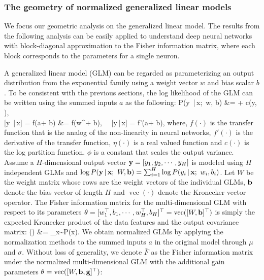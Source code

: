 \documentclass{article}
\newcommand{\T}{\top}
\def\bea#1\eea{\begin{align}#1\end{align}}
\DeclareMathOperator{\vecop}{vec}
\newcommand{\Target}{{\bold y}}
\newcommand{\Gain}{{\bold g}}
\newcommand{\bias}{{b}}
\newcommand{\Bias}{{\bold b}}
\newcommand{\weights}{{w}}
\newcommand{\act}{{a}}
\newcommand{\fisher}{{F}}
\newcommand{\data}{{\bold x}}
\newcommand{\expectation}{\mathop{\mathbb{E}}}
\newcommand{\given}{\,|\,}
\newcommand{\target}{y}
\begin{document}
\subsubsection{The geometry of normalized generalized linear models}
We focus our geometric analysis on the generalized linear model. The results from the following analysis can be easily applied to understand deep neural networks with block-diagonal approximation to the Fisher information matrix, where each block corresponds to the parameters for a single neuron. 

A generalized linear model (GLM) can be regarded as parameterizing an output distribution from the exponential family using a weight vector $w$ and bias scalar $b$. To be consistent with the previous sections, the log likelihood of the GLM can be written using the summed inputs $a$ as the following:
\bea
\log P(y \given \data ;\  w, b) &= \frac{(\act+b) y - \eta(\act+b)}{\phi} + c(y, \phi),\\
\expectation[y \given \data] = f(\act + b) &= f(\weights^\T \data + b), \ \  [\target \given \data] = \phi f'(\act + b),
\eea
where, $f(\cdot)$ is the transfer function that is the analog of the non-linearity in neural networks, $f'(\cdot)$ is the derivative of the transfer function, $\eta(\cdot)$ is a real valued function and $c(\cdot)$ is the log partition function. $\phi$ is a constant that scales the output variance.
Assume a $H$-dimensional output vector $\Target = [y_1, y_2, \cdots, y_H]$ is modeled using $H$ independent GLMs and $\log P(\Target \given \data ;\ W, \Bias) = \sum_{i=1}^H \log P(y_i \given \data ;\ w_i, b_i) $. Let $W$ be the weight matrix whose rows are the weight vectors of the individual GLMs, $\Bias$ denote the bias vector of length $H$ and $\vecop(\cdot)$ denote the Kronecker vector operator.
The Fisher information matrix for the multi-dimensional GLM with respect to its parameters $\theta=[\weights_1^\T, \bias_1,\cdots,\weights_H^\T, \bias_H]^\T = \vecop([W, \Bias]^\T)$ is simply the expected Kronecker product of the data features and the output covariance matrix: 
\bea
\fisher(\theta) &= \expectation_{\data \sim P(\data)}\left[\frac{\text{Cov}[\Target \given \data]}{\phi^2}\otimes\begin{bmatrix}\data\data^\T & \data \\ \data^\T & 1\end{bmatrix}\right].
\eea
We obtain normalized GLMs by applying the normalization methods to the summed inputs $a$ in the original model through $\mu$ and $\sigma$. Without loss of generality, we denote $\bar{\fisher}$ as the Fisher information matrix under the normalized multi-dimensional GLM with the additional gain parameters $\theta=\vecop([W, \Bias, \Gain]^\T)$:
\end{document}
